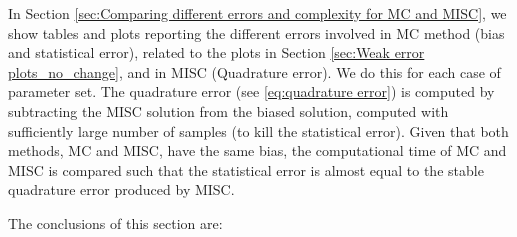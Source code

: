 In Section \ref{sec:Comparing different  errors and complexity for MC and MISC}, we show tables and plots reporting  the different errors involved in MC method (bias and statistical error), related to the plots in Section \ref{sec:Weak error plots_no_change}, and in MISC (Quadrature error). We do this for each case of parameter set. The quadrature error (see \eqref{eq:quadrature error}) is computed by subtracting the MISC solution from the biased solution, computed with sufficiently large  number of samples (to kill the statistical error). Given that both methods, MC and MISC, have the same bias,  the computational time of MC and MISC is compared such that the statistical error is almost equal to the stable quadrature error produced by MISC.

 The conclusions of this section are: 


